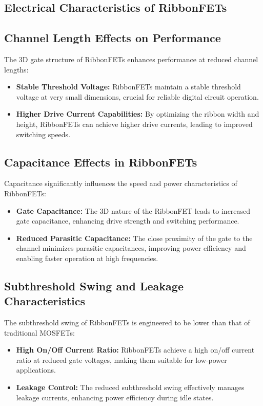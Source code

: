 \documentclass[12pt]{report}
\begin{document}
\begin{titlepage}
\section{Electrical Characteristics of RibbonFETs}
\subsection{Channel Length Effects on Performance}
The 3D gate structure of RibbonFETs enhances performance at reduced channel lengths:
\begin{itemize}
    \item \textbf{Stable Threshold Voltage:} RibbonFETs maintain a stable threshold voltage at very small dimensions, crucial for reliable digital circuit operation.
    \item \textbf{Higher Drive Current Capabilities:} By optimizing the ribbon width and height, RibbonFETs can achieve higher drive currents, leading to improved switching speeds.
\end{itemize}

\subsection{Capacitance Effects in RibbonFETs}
Capacitance significantly influences the speed and power characteristics of RibbonFETs:
\begin{itemize}
    \item \textbf{Gate Capacitance:} The 3D nature of the RibbonFET leads to increased gate capacitance, enhancing drive strength and switching performance.
    \item \textbf{Reduced Parasitic Capacitance:} The close proximity of the gate to the channel minimizes parasitic capacitances, improving power efficiency and enabling faster operation at high frequencies.
\end{itemize}

\subsection{Subthreshold Swing and Leakage Characteristics}
The subthreshold swing of RibbonFETs is engineered to be lower than that of traditional MOSFETs:
\begin{itemize}
    \item \textbf{High On/Off Current Ratio:} RibbonFETs achieve a high on/off current ratio at reduced gate voltages, making them suitable for low-power applications.
    \item \textbf{Leakage Control:} The reduced subthreshold swing effectively manages leakage currents, enhancing power efficiency during idle states.
\end{itemize}


\end{titlepage}
\end{document}
